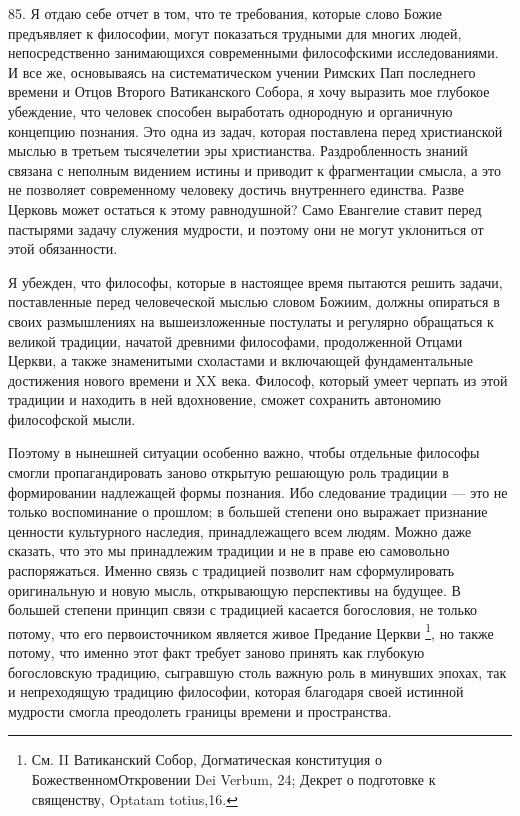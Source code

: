 \documentclass[a5paper,10pt]{article}
\begin{document}
85. Я отдаю себе отчет в том, что те требования, которые слово Божие
предъявляет к философии, могут показаться трудными для многих людей,
непосредственно занимающихся современными философскими исследованиями. И все
же, основываясь на систематическом учении Римских Пап последнего времени и
Отцов Второго Ватиканского Собора, я хочу выразить мое глубокое убеждение, что
человек способен выработать однородную и органичную концепцию познания. Это
одна из задач, которая поставлена перед христианской мыслью в третьем
тысячелетии эры христианства. Раздробленность знаний связана с неполным
видением истины и приводит к фрагментации смысла, а это не позволяет
современному человеку достичь внутреннего единства. Разве Церковь может
остаться к этому равнодушной? Само Евангелие ставит перед пастырями задачу
служения мудрости, и поэтому они не могут уклониться от этой обязанности.

Я убежден, что философы, которые в настоящее время пытаются решить задачи,
поставленные перед человеческой мыслью словом Божиим, должны опираться в своих
размышлениях на вышеизложенные постулаты и регулярно обращаться к великой
традиции, начатой древними философами, продолженной Отцами Церкви, а также
знаменитыми схоластами и включающей фундаментальные достижения нового времени и
XX века. Философ, который умеет черпать из этой традиции и находить в ней
вдохновение, сможет сохранить автономию философской мысли.

Поэтому в нынешней ситуации особенно важно, чтобы отдельные философы смогли
пропагандировать заново открытую решающую роль традиции в формировании
надлежащей формы познания. Ибо следование традиции — это не только воспоминание
о прошлом; в большей степени оно выражает признание ценности культурного
наследия, принадлежащего всем людям. Можно даже сказать, что это мы принадлежим
традиции и не в праве ею самовольно распоряжаться. Именно связь с традицией
позволит нам сформулировать оригинальную и новую мысль, открывающую перспективы
на будущее. В большей степени принцип связи с традицией касается богословия, не
только потому, что его первоисточником является живое Предание Церкви
\footnote{См. II Ватиканский Собор, Догматическая конституция о
БожественномОткровении Dei Verbum, 24; Декрет о подготовке к священству,
Optatam totius,16.}, но также потому, что именно этот факт требует заново
принять как глубокую богословскую традицию, сыгравшую столь важную роль в
минувших эпохах, так и непреходящую традицию философии, которая благодаря своей
истинной мудрости смогла преодолеть границы времени и пространства.
\end{document}
